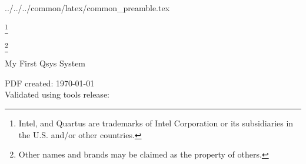 %
%
%
%
%

\newcommand{\repoTopPath}{../../..}
\newcommand{\commonPreamblePath}{\repoTopPath/common/latex/common_preamble.tex}
 \commonPreamblePath


\sffamily

\begin{center}
\let\savethefootnote\thefootnote
\let\thefootnote\relax\footnote{Intel, and Quartus are trademarks of Intel Corporation or its subsidiaries in the U.S. and/or other countries.}
\addtocounter{footnote}{-1}
\let\thefootnote\savethefootnote
\hspace{-1em}
\let\savethefootnote\thefootnote
\let\thefootnote\relax\footnote{Other names and brands may be claimed as the property of others.}
\addtocounter{footnote}{-1}
\let\thefootnote\savethefootnote
\hspace{-1em}
\LARGE{My First Qsys System}\\[1em]
\end{center}

\begin{flushleft}
\normalsize{PDF created: \today}\\
\normalsize{Validated using tools release: \TheToolsReleaseVersion}
\end{flushleft}

